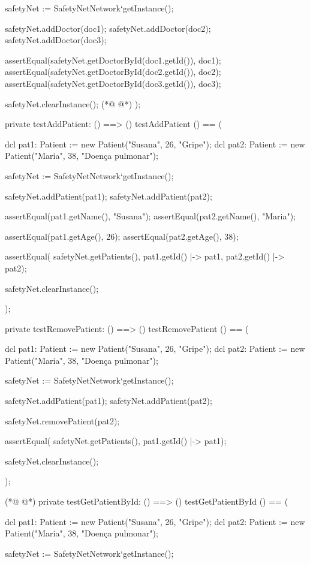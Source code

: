 \begin{vdmpp}[breaklines=true]
  safetyNet := SafetyNetNetwork`getInstance();
   
  safetyNet.addDoctor(doc1);
  safetyNet.addDoctor(doc2);
  safetyNet.addDoctor(doc3);
  
  assertEqual(safetyNet.getDoctorById(doc1.getId()), doc1);
  assertEqual(safetyNet.getDoctorById(doc2.getId()), doc2);
  assertEqual(safetyNet.getDoctorById(doc3.getId()), doc3);
 
  safetyNet.clearInstance();
(*@
\label{testAddAppointment:557}
@*)
);

private testAddPatient: () ==> ()
 testAddPatient () == (
 
  dcl pat1: Patient := new Patient("Susana", 26, "Gripe");
  dcl pat2: Patient := new Patient("Maria", 38, "Doença pulmonar");
   
  safetyNet := SafetyNetNetwork`getInstance();
   
  safetyNet.addPatient(pat1);
  safetyNet.addPatient(pat2);
  
  assertEqual(pat1.getName(), "Susana");
  assertEqual(pat2.getName(), "Maria");
  
  assertEqual(pat1.getAge(), 26);
  assertEqual(pat2.getAge(), 38); 

  assertEqual( safetyNet.getPatients(), {pat1.getId() |-> pat1, pat2.getId() |-> pat2});
  
  safetyNet.clearInstance();
    
);

private testRemovePatient: () ==> ()
 testRemovePatient () == (
 
  dcl pat1: Patient := new Patient("Susana", 26, "Gripe");
  dcl pat2: Patient := new Patient("Maria", 38, "Doença pulmonar");
   
  safetyNet := SafetyNetNetwork`getInstance();
   
  safetyNet.addPatient(pat1);
  safetyNet.addPatient(pat2);
  
  safetyNet.removePatient(pat2);

  assertEqual( safetyNet.getPatients(), {pat1.getId() |-> pat1});
  
  safetyNet.clearInstance();
    
);

(*@
\label{testGetPatientById:601}
@*)
private testGetPatientById: () ==> ()
 testGetPatientById () == (
   
  dcl pat1: Patient := new Patient("Susana", 26, "Gripe");
  dcl pat2: Patient := new Patient("Maria", 38, "Doença pulmonar");
  
  safetyNet := SafetyNetNetwork`getInstance();
   

\end{vdmpp}
